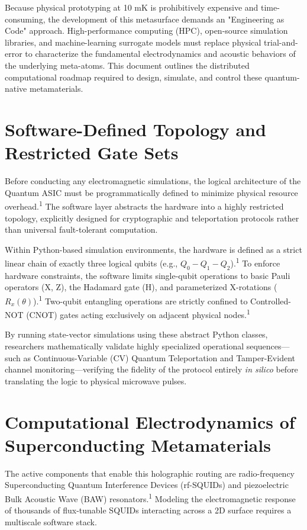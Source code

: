 \documentclass[11pt, a4paper]{article}
\begin{document}
Because physical prototyping at 10 mK is prohibitively expensive and time-consuming, the development of this metasurface demands an "Engineering as Code" approach. High-performance computing (HPC), open-source simulation libraries, and machine-learning surrogate models must replace physical trial-and-error to characterize the fundamental electrodynamics and acoustic behaviors of the underlying meta-atoms. This document outlines the distributed computational roadmap required to design, simulate, and control these quantum-native metamaterials.

\section{Software-Defined Topology and Restricted Gate Sets}

Before conducting any electromagnetic simulations, the logical architecture of the Quantum ASIC must be programmatically defined to minimize physical resource overhead.\textsuperscript{1} The software layer abstracts the hardware into a highly restricted topology, explicitly designed for cryptographic and teleportation protocols rather than universal fault-tolerant computation.

Within Python-based simulation environments, the hardware is defined as a strict linear chain of exactly three logical qubits (e.g., $Q_0 - Q_1 - Q_2$).\textsuperscript{1} To enforce hardware constraints, the software limits single-qubit operations to basic Pauli operators (X, Z), the Hadamard gate (H), and parameterized X-rotations ($R_x(\theta)$).\textsuperscript{1} Two-qubit entangling operations are strictly confined to Controlled-NOT (CNOT) gates acting exclusively on adjacent physical nodes.\textsuperscript{1}

By running state-vector simulations using these abstract Python classes, researchers mathematically validate highly specialized operational sequences---such as Continuous-Variable (CV) Quantum Teleportation and Tamper-Evident channel monitoring---verifying the fidelity of the protocol entirely \textit{in silico} before translating the logic to physical microwave pulses.

\section{Computational Electrodynamics of Superconducting Metamaterials}

The active components that enable this holographic routing are radio-frequency Superconducting Quantum Interference Devices (rf-SQUIDs) and piezoelectric Bulk Acoustic Wave (BAW) resonators.\textsuperscript{1} Modeling the electromagnetic response of thousands of flux-tunable SQUIDs interacting across a 2D surface requires a multiscale software stack.
\end{document}
